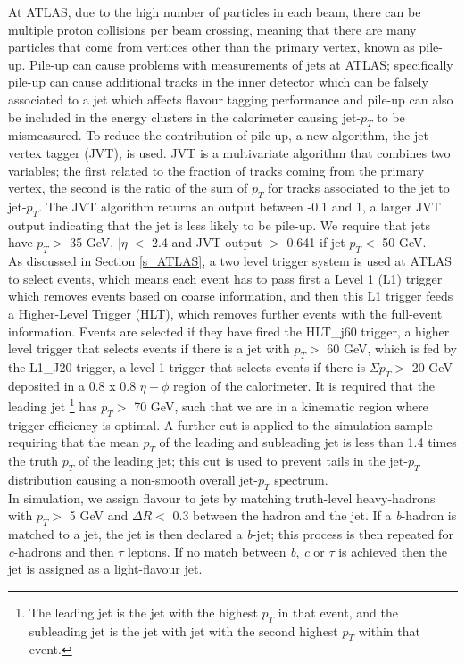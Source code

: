 \documentclass[12pt, onecolumn,notitlepage]{article}
\begin{document}
At ATLAS, due to the high number of particles in each beam, there can be multiple proton collisions per beam crossing,
meaning that there are many particles that come from vertices other than the primary vertex, known as pile-up.
Pile-up can cause problems with measurements of jets at ATLAS; 
specifically pile-up can cause additional tracks in the inner detector which can be falsely associated to a jet which affects flavour tagging performance 
and pile-up can also be included in the energy clusters in the calorimeter causing jet-$p_T$ to be mismeasured.
To reduce the contribution of pile-up, a new algorithm, the jet vertex tagger (JVT)\cite{bib_JVT}, is used. 
JVT is a multivariate algorithm that combines two variables; the first related to the fraction of tracks coming from the primary vertex, the second is the ratio of the sum of 
$p_{T}$ for tracks associated to the jet to jet-$p_{T}$. The JVT algorithm returns an output between -0.1 and 1, a larger JVT output indicating that the jet is less likely to be pile-up.
We require that jets have $p_{T} >$ 35 GeV, $|\eta| <$ 2.4 and JVT output $>$ 0.641 if jet-$p_{T} <$ 50 GeV. \\

As discussed in Section \ref{s_ATLAS}, a two level trigger system is used at ATLAS to select events, 
which means each event has to pass first a Level 1 (L1) trigger which removes events based on coarse information, 
and then this L1 trigger feeds a Higher-Level Trigger (HLT), which removes further events with the full-event information.
Events are selected if they have fired the HLT\_j60 trigger, a higher level trigger that selects events if there is a jet with $p_{T} >$ 60 GeV, 
which is fed by the L1\_J20 trigger, a level 1 trigger that selects events if there is $\Sigma p_{T} >$ 20 GeV deposited in a 0.8 x 0.8 $\eta-\phi$ region of the calorimeter.
It is required that the leading jet \footnote{ The leading jet is the jet with the highest $p_T$ in that event, and the subleading jet is the jet 
with jet with the second highest $p_T$ within that event.}
has $p_{T} >$ 70 GeV, such that we are in a kinematic region where trigger efficiency is optimal.
A further cut is applied to the simulation sample requiring that the mean $p_{T}$ of the leading and subleading jet is less than 1.4 times the truth $p_{T}$ of the 
leading jet; this cut is used to prevent tails in the jet-$p_T$ distribution causing a non-smooth overall jet-$p_T$ spectrum.  \\

In simulation, we assign flavour to jets by matching truth-level heavy-hadrons with $p_{T} >$ 5 GeV and $\Delta R <$ 0.3 between the hadron and the jet.
If a \textit{b}-hadron is matched to a jet, the jet is then declared a \textit{b}-jet; this process is then repeated for \textit{c}-hadrons and then $\tau$ leptons.
If no match between \textit{b}, \textit{c} or $\tau$ is achieved then the jet is assigned as a light-flavour jet.
   
\end{document}
